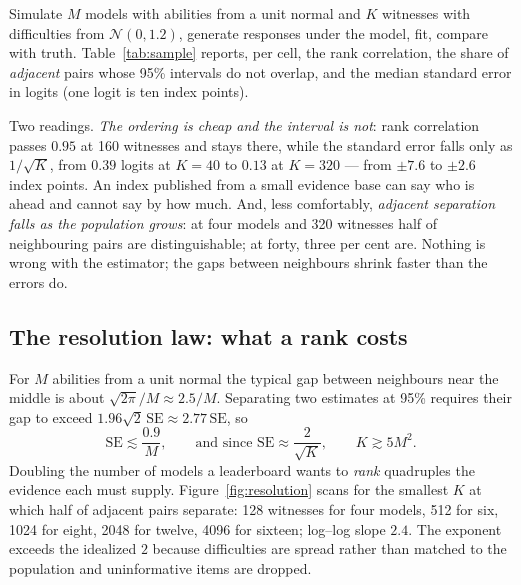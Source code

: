 Simulate $M$ models with abilities from a unit normal and $K$ witnesses with difficulties from $\mathcal N(0, 1.2)$, generate responses under the model, fit, compare with truth. Table~\ref{tab:sample} reports, per cell, the rank correlation, the share of \emph{adjacent} pairs whose 95\% intervals do not overlap, and the median standard error in logits (one logit is ten index points).

\begin{table}[!htbp]\centering\small

\caption{Recovery against known truth: Spearman / share of adjacent pairs separated at 95\% / median standard error, at $M$ models and $K$ witnesses, median over 30 replications. Spearman is uninformative below about eight models --- with two or three, any estimator orders them almost surely --- which is why the middle number matters more.}
\label{tab:sample}
\end{table}

Two readings. \emph{The ordering is cheap and the interval is not}: rank correlation passes $0.95$ at 160 witnesses and stays there, while the standard error falls only as $1/\sqrt K$, from $0.39$ logits at $K = 40$ to $0.13$ at $K = 320$ --- from $\pm 7.6$ to $\pm 2.6$ index points. An index published from a small evidence base can say who is ahead and cannot say by how much. And, less comfortably, \emph{adjacent separation falls as the population grows}: at four models and 320 witnesses half of neighbouring pairs are distinguishable; at forty, three per cent are. Nothing is wrong with the estimator; the gaps between neighbours shrink faster than the errors do.

\subsection{The resolution law: what a rank costs}\label{sec:resolution}

For $M$ abilities from a unit normal the typical gap between neighbours near the middle is about $\sqrt{2\pi}/M \approx 2.5/M$. Separating two estimates at 95\% requires their gap to exceed $1.96\sqrt2\,\mathrm{SE} \approx 2.77\,\mathrm{SE}$, so
\[
\mathrm{SE} \lesssim \frac{0.9}{M}, \qquad \text{and since } \mathrm{SE} \approx \frac{2}{\sqrt K}, \qquad K \gtrsim 5M^2 .
\]
Doubling the number of models a leaderboard wants to \emph{rank} quadruples the evidence each must supply. Figure~\ref{fig:resolution} scans for the smallest $K$ at which half of adjacent pairs separate: 128 witnesses for four models, 512 for six, 1024 for eight, 2048 for twelve, 4096 for sixteen; log--log slope $2.4$. The exponent exceeds the idealized $2$ because difficulties are spread rather than matched to the population and uninformative items are dropped.

